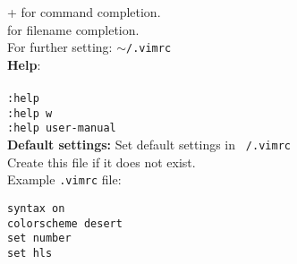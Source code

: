 +  for command completion.\\
 for filename completion.\\
For further setting: \texttt{$\sim$/.vimrc} \\
\textbf{Help}:\\
\\
\texttt{:help}\\
\texttt{:help w}\\
\texttt{:help user-manual}\\

\textbf{Default settings:}
Set default settings in \texttt{~/.vimrc} \\
Create this file if it does not exist. \\
Example \texttt{.vimrc} file:\\

\begin{mdframed}
\texttt{syntax on}\\
\texttt{colorscheme desert}\\
\texttt{set number}\\
\texttt{set hls}

\end{mdframed}

\vfill\null

\columnbreak

